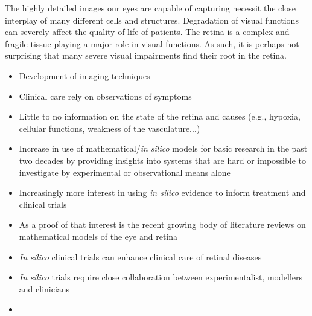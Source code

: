 \documentclass[12pt,a4paper]{article}
\begin{document}
The highly detailed images our eyes are capable of capturing necessit the close interplay of many different cells and structures.
Degradation of visual functions can severely affect the quality of life of patients.
The retina is a complex and fragile tissue playing a major role in visual functions.
As such, it is perhaps not surprising that many severe visual impairments find their root in the retina.

\begin{itemize}
\item Development of imaging techniques
\item Clinical care rely on observations of symptoms
\item Little to no information on the state of the retina and causes (e.g., hypoxia, cellular functions, weakness of the vasculature...)
\item Increase in use of mathematical/\textit{in silico} models for basic research in the past two decades by providing insights into systems that are hard or impossible to investigate by experimental or observational means alone
\item Increasingly more interest in using \textit{in silico} evidence to inform treatment and clinical trials
\item As a proof of that interest is the recent growing body of literature reviews on mathematical models of the eye and retina
\item \textit{In silico} clinical trials can enhance clinical care of retinal diseases
\item \textit{In silico} trials require close collaboration between experimentalist, modellers and clinicians 
\item 
\end{itemize}


\end{document}
